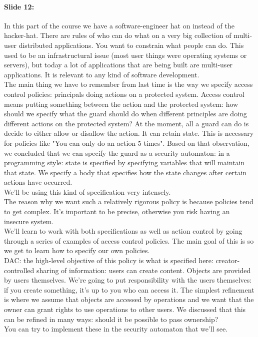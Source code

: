 \documentclass[10pt,a4paper]{report}
\begin{document}
\paragraph{Slide 12:} In this part of the course we have a software-engineer hat on instead of the hacker-hat. There are rules of who can do what on a very big collection of multi-user distributed applications. You want to constrain what people can do. This used to be an infrastructural issue (most user things were operating systems or servers), but today a lot of applications that are being built are multi-user applications. It is relevant to any kind of software development.\\
The main thing we have to remember from last time is the way we specify access control policies: principals doing actions on a protected system. Access control means putting something between the action and the protected system: how should we specify what the guard should do when different principles are doing different actions on the protected system? At the moment, all a guard can do is decide to either allow or disallow the action. It can retain state. This is necessary for policies like "You can only do an action 5 times". Based on that observation, we concluded that we can specify the guard as a security automaton: in a programming style: state is specified by specifying variables that will maintain that state. We specify a body that specifies how the state changes after certain actions have occurred. \\
We'll be using this kind of specification very intensely.\\
The reason why we want such a relatively rigorous policy is because policies tend to get complex. It's important to be precise, otherwise you risk having an insecure system.\\
We'll learn to work with both specifications as well as action control by going through a series of examples of access control policies. The main goal of this is so we get to learn how to specify our own policies. \\
DAC: the high-level objective of this policy is what is specified here: creator-controlled sharing of information: users can create content. Objects are provided by users themselves. We're going to put responsibility with the users themselves: if you create something, it's up to you who can access it. The simplest refinement is where we assume that objects are accessed by operations and we want that the owner can grant rights to use operations to other users. We discussed that this can be refined in many ways: should it be possible to pass ownership?\\
You can try to implement these in the security automaton that we'll see.
\end{document}
